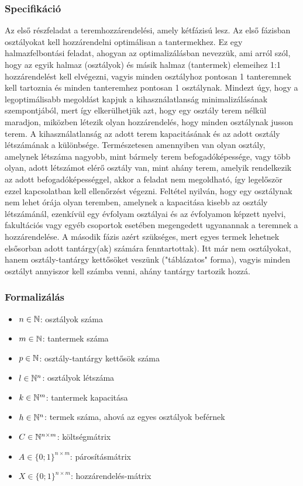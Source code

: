\documentclass[a4paper,12pt]{article}
\begin{document}
\subsubsection{Specifikáció}

Az első részfeladat a teremhozzárendelési, amely kétfázisú lesz. Az első fázisban osztályokat kell hozzárendelni optimálisan a tantermekhez. Ez egy halmazfelbontási feladat, ahogyan az optimalizálásban nevezzük, ami arról szól, hogy az egyik halmaz (osztályok) és másik halmaz (tantermek) elemeihez 1:1 hozzárendelést kell elvégezni, vagyis minden osztályhoz pontosan
1 tanteremnek kell tartoznia és minden tanteremhez pontosan 1 osztálynak. Mindezt úgy, hogy a legoptimálisabb megoldást kapjuk a kihasználatlanság minimalizálásának szempontjából, mert így elkerülhetjük azt, hogy egy osztály terem nélkül maradjon, miközben létezik olyan hozzárendelés, hogy minden osztálynak jusson terem. A kihasználatlanság az adott terem kapacitásának és az adott osztály létszámának a különbsége. Természetesen amennyiben van olyan osztály, amelynek létszáma nagyobb, mint bármely terem befogadóképessége, vagy több olyan, adott létszámot elérő osztály van, mint ahány terem, amelyik rendelkezik az adott befogadóképességgel, akkor a feladat nem megoldható, így legelőször ezzel kapcsolatban kell ellenőrzést végezni. Feltétel nyilván, hogy egy osztálynak nem lehet órája olyan teremben, amelynek a kapacitása kisebb az osztály létszámánál, ezenkívül egy évfolyam osztályai és az évfolyamon képzett nyelvi, fakultációs vagy egyéb csoportok esetében megengedett ugyanannak a teremnek a hozzárendelése. A második
fázis azért szükséges, mert egyes termek lehetnek elsősorban adott tantárgy(ak) számára fenntartottak). Itt már nem osztályokat, hanem osztály-tantárgy kettősöket veszünk ("táblázatos" forma), vagyis minden osztályt annyiszor kell számba venni, ahány tantárgy tartozik hozzá. 

\subsubsection{Formalizálás}

\begin{itemize}
    \item $n \in \Bbb{N}$: osztályok száma
    \item $m \in \Bbb{N}$: tantermek száma
    \item $p \in \Bbb{N}$: osztály-tantárgy kettősök száma
    \item $l \in \Bbb{N}^n$: osztályok létszáma
    \item $k \in \Bbb{N}^m$: tantermek kapacitása
    \item $h \in \Bbb{N}^n$: termek száma, ahová az egyes osztályok beférnek
    \item $C \in \Bbb{N}^{n \times m}$: költségmátrix
    \item $A \in \{0;1\}^{n \times m}$: párosításmátrix
    \item $X \in \{0;1\}^{n \times m}$: hozzárendelés-mátrix
\end{itemize}
\end{document}
